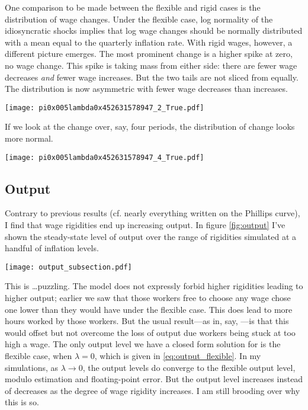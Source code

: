 \documentclass[12pt,a4paper]{scrartcl}            %
\begin{document}
One comparison to be made between the flexible and rigid cases is the distribution of wage changes.
Under the flexible case, log normality of the idiosyncratic shocks implies that log wage changes should be normally distributed with a mean equal to the quarterly inflation rate.
With rigid wages, however, a different picture emerges.
The most prominent change is a higher spike at zero, no wage change.
This spike is taking mass from either side: there are fewer wage decreases \emph{and} fewer wage increases.
But the two tails are not sliced from equally.
The distribution is now asymmetric with fewer wage decreases than increases.
\begin{center}
  \texttt{[image: pi0x005lambda0x452631578947\_2\_True.pdf]}
  \label{fig:dist_2_periods}
\end{center}

If we look at the change over, say, four periods, the distribution of change looks more normal.

\begin{center}
  \texttt{[image: pi0x005lambda0x452631578947\_4\_True.pdf]}
  \label{fig:dist_4_periods}
\end{center}


\subsection{Output}

Contrary to previous results (cf. nearly everything written on the Phillips curve), I find that wage rigidities end up increasing output.
In figure \ref{fig:output} I've shown the steady-state level of output over the range of rigidities simulated at a handful of inflation levels.

\begin{center}
  \texttt{[image: output\_subsection.pdf]}
  \label{fig:output}
\end{center}

This is \ldots puzzling.
The model does not expressly forbid higher rigidities leading to higher output;
earlier we saw that those workers free to choose any wage chose one lower than they would have under the flexible case.
This does lead to more hours worked by those workers.
But the usual result---as in, say, \cite{daly_hobijn_2013}---is that this would offset but not overcome the loss of output due workers being stuck at too high a wage.
The only output level we have a closed form solution for is the flexible case, when $\lambda = 0$, which is given in \eqref{eq:output_flexible}.
In my simulations, as $\lambda \rightarrow 0$, the output levels do converge to the flexible output level, modulo estimation and floating-point error.
But the output level increases instead of decreases as the degree of wage rigidity increases.
I am still brooding over why this is so.
\end{document}
